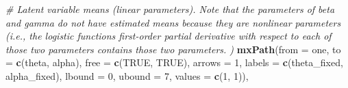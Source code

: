 \documentclass[
12pt, %
twoside,
english]{guelphthesis}
\newenvironment{Shaded}{\begin{snugshade}}{\end{snugshade}}
\newcommand{\AttributeTok}[1]{\textcolor[rgb]{0.13,0.29,0.53}{#1}}
\newcommand{\CommentTok}[1]{\textcolor[rgb]{0.56,0.35,0.01}{\textit{#1}}}
\newcommand{\ConstantTok}[1]{\textcolor[rgb]{0.56,0.35,0.01}{#1}}
\newcommand{\DecValTok}[1]{\textcolor[rgb]{0.00,0.00,0.81}{#1}}
\newcommand{\FunctionTok}[1]{\textcolor[rgb]{0.13,0.29,0.53}{\textbf{#1}}}
\newcommand{\NormalTok}[1]{#1}
\newcommand{\StringTok}[1]{\textcolor[rgb]{0.31,0.60,0.02}{#1}}
\begin{document}
\begin{Shaded}
\begin{Highlighting}[numbers=left,,]
  \CommentTok{\# Latent variable means (linear parameters). Note that the parameters of beta and gamma do not have estimated means because they are nonlinear parameters (i.e., the logistic function\textquotesingle{}s first{-}order partial derivative with respect to each of those two parameters contains those two parameters. )}
  \FunctionTok{mxPath}\NormalTok{(}\AttributeTok{from =} \StringTok{\textquotesingle{}one\textquotesingle{}}\NormalTok{, }\AttributeTok{to =} \FunctionTok{c}\NormalTok{(}\StringTok{\textquotesingle{}theta\textquotesingle{}}\NormalTok{, }\StringTok{\textquotesingle{}alpha\textquotesingle{}}\NormalTok{), }\AttributeTok{free =} \FunctionTok{c}\NormalTok{(}\ConstantTok{TRUE}\NormalTok{, }\ConstantTok{TRUE}\NormalTok{), }\AttributeTok{arrows =} \DecValTok{1}\NormalTok{,}
         \AttributeTok{labels =} \FunctionTok{c}\NormalTok{(}\StringTok{\textquotesingle{}theta\_fixed\textquotesingle{}}\NormalTok{, }\StringTok{\textquotesingle{}alpha\_fixed\textquotesingle{}}\NormalTok{), }\AttributeTok{lbound =} \DecValTok{0}\NormalTok{, }\AttributeTok{ubound =} \DecValTok{7}\NormalTok{, }
         \AttributeTok{values =} \FunctionTok{c}\NormalTok{(}\DecValTok{1}\NormalTok{, }\DecValTok{1}\NormalTok{)),}
  

\end{Highlighting}
\end{Shaded}
\end{document}
